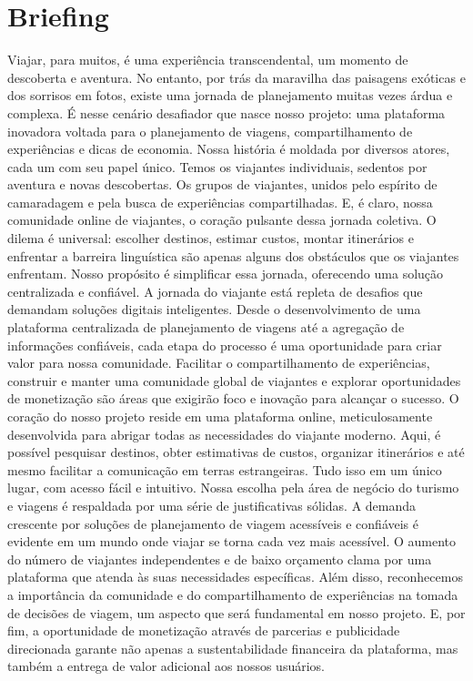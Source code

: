 \documentclass{article}
\begin{document}
\section{Briefing}
Viajar, para muitos, é uma experiência transcendental, um momento de descoberta e aventura. No entanto, por trás da maravilha das paisagens exóticas e dos sorrisos em fotos, existe uma jornada de planejamento muitas vezes árdua e complexa. É nesse cenário desafiador que nasce nosso projeto: uma plataforma inovadora voltada para o planejamento de viagens, compartilhamento de experiências e dicas de economia.
Nossa história é moldada por diversos atores, cada um com seu papel único. Temos os viajantes individuais, sedentos por aventura e novas descobertas. Os grupos de viajantes, unidos pelo espírito de camaradagem e pela busca de experiências compartilhadas. E, é claro, nossa comunidade online de viajantes, o coração pulsante dessa jornada coletiva. O dilema é universal: escolher destinos, estimar custos, montar itinerários e enfrentar a barreira linguística são apenas alguns dos obstáculos que os viajantes enfrentam. Nosso propósito é simplificar essa jornada, oferecendo uma solução centralizada e confiável.
A jornada do viajante está repleta de desafios que demandam soluções digitais inteligentes. Desde o desenvolvimento de uma plataforma centralizada de planejamento de viagens até a agregação de informações confiáveis, cada etapa do processo é uma oportunidade para criar valor para nossa comunidade. Facilitar o compartilhamento de experiências, construir e manter uma comunidade global de viajantes e explorar oportunidades de monetização são áreas que exigirão foco e inovação para alcançar o sucesso. O coração do nosso projeto reside em uma plataforma online, meticulosamente desenvolvida para abrigar todas as necessidades do viajante moderno. Aqui, é possível pesquisar destinos, obter estimativas de custos, organizar itinerários e até mesmo facilitar a comunicação em terras estrangeiras. Tudo isso em um único lugar, com acesso fácil e intuitivo.
Nossa escolha pela área de negócio do turismo e viagens é respaldada por uma série de justificativas sólidas. A demanda crescente por soluções de planejamento de viagem acessíveis e confiáveis é evidente em um mundo onde viajar se torna cada vez mais acessível. O aumento do número de viajantes independentes e de baixo orçamento clama por uma plataforma que atenda às suas necessidades específicas. Além disso, reconhecemos a importância da comunidade e do compartilhamento de experiências na tomada de decisões de viagem, um aspecto que será fundamental em nosso projeto. E, por fim, a oportunidade de monetização através de parcerias e publicidade direcionada garante não apenas a sustentabilidade financeira da plataforma, mas também a entrega de valor adicional aos nossos usuários.
\end{document}
